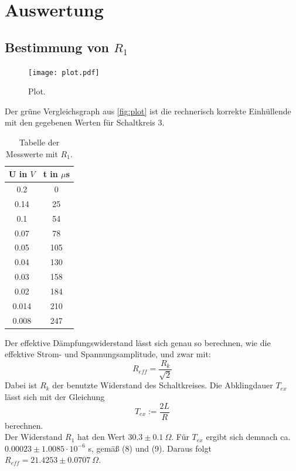 \section{Auswertung}
\label{sec:Auswertung}

\subsection{Bestimmung von \(R_1\)}
\begin{figure}
  \centering
  \texttt{[image: plot.pdf]}
  \caption{Plot.}
  \label{fig:plot}
\end{figure}
Der grüne Vergleichsgraph aus \autoref{fig:plot} ist die rechnerisch korrekte Einhüllende mit den gegebenen Werten für Schaltkreis 3.
\begin{table}[htp]
  \centering
  \caption{Tabelle der Messwerte mit \(R_1\).}
  \label{tab:tab1}
  \begin{tabular}{c c}
    \toprule
    U in $V$ & t in $\mu$s\\
    \midrule
    0.2 & 0\\
    0.14 & 25\\
    0.1 & 54\\
    0.07 & 78\\
    0.05 & 105\\
    0.04 & 130\\
    0.03 & 158\\
    0.02 & 184\\
    0.014 & 210\\
    0.008 & 247\\
    \bottomrule
  \end{tabular}
\end{table}

Der effektive Dämpfungswiderstand lässt sich genau so berechnen, wie die effektive Strom- und Spannungsamplitude, und zwar mit:
\begin{equation}
    R_{eff} = \frac{R_k}{\sqrt{2}} 
\end{equation}
\newpage
Dabei ist \(R_k\) der benutzte Widerstand des Schaltkreises.
Die Abklingdauer \(T_{ex}\) lässt sich mit der Gleichung
\begin{equation}
    T_{ex} := \frac{2L}{R}
\end{equation}
berechnen.\\
Der Widerstand $R_1$ hat den Wert $30.3\pm0.1\ \Omega$.
Für $T_{ex}$ ergibt sich demnach ca. $0.00023\pm1.0085\cdot10^{-6}$ s, gemäß (8) und (9).
Daraus folgt $R_{eff} = 21.4253\pm0.0707\ \Omega$.

